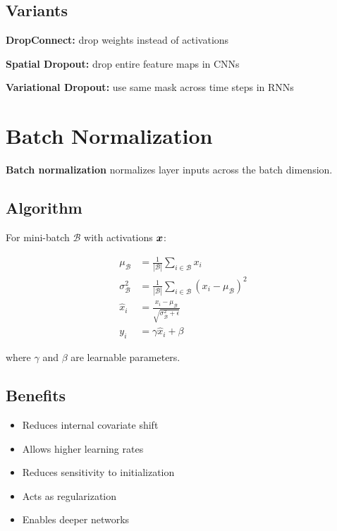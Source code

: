 \subsection{Variants}

\textbf{DropConnect:} drop weights instead of activations

\textbf{Spatial Dropout:} drop entire feature maps in CNNs

\textbf{Variational Dropout:} use same mask across time steps in RNNs

\section{Batch Normalization}
\label{sec:batch-normalization}

\textbf{Batch normalization} normalizes layer inputs across the batch dimension.

\subsection{Algorithm}

For mini-batch $\mathcal{B}$ with activations $\boldsymbol{x}$:

\begin{align}
\mu_{\mathcal{B}} &= \frac{1}{|\mathcal{B}|} \sum_{i \in \mathcal{B}} x_i \\
\sigma^2_{\mathcal{B}} &= \frac{1}{|\mathcal{B}|} \sum_{i \in \mathcal{B}} (x_i - \mu_{\mathcal{B}})^2 \\
\hat{x}_i &= \frac{x_i - \mu_{\mathcal{B}}}{\sqrt{\sigma^2_{\mathcal{B}} + \epsilon}} \\
y_i &= \gamma \hat{x}_i + \beta
\end{align}

where $\gamma$ and $\beta$ are learnable parameters.

\subsection{Benefits}

\begin{itemize}
    \item Reduces internal covariate shift
    \item Allows higher learning rates
    \item Reduces sensitivity to initialization
    \item Acts as regularization
    \item Enables deeper networks
\end{itemize}

